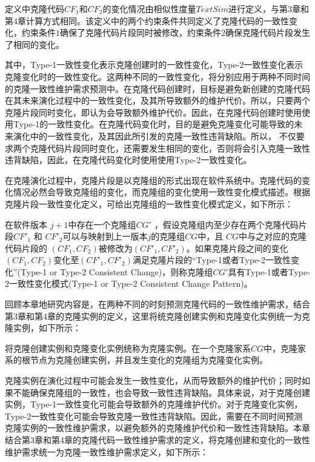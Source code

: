 定义中克隆代码$ CF_1 $和$ CF_2 $的变化情况由相似性度量$ \mathit {TextSim} $进行定义，与第3章和第4章计算方式相同。该定义中的两个约束条件共同定义了克隆代码的一致性变化，约束条件$1$确保了克隆代码片段同时被修改，约束条件$2$确保克隆代码片段发生了相同的变化。

其中，Type-1一致性变化表示克隆创建时的一致性变化，Type-2一致性变化表示克隆变化时的一致性变化。这两种不同的一致性变化，将分别应用于两种不同时间的克隆一致性维护需求预测中。在克隆代码创建时，目标是避免新创建的克隆代码在其未来演化过程中的一致性变化，及其所导致额外的维护代价。所以，只要两个克隆片段同时变化，即认为会导致额外维护代价。因此，在克隆代码创建时使用使用Type-1的一致性变化。在克隆代码变化时，目的是避免克隆变化可能导致的未来演化中的一致性变化，及其因此所引发的克隆一致性违背缺陷。所以， 不仅要求两个克隆代码片段同时变化，还需要发生相同的变化，否则将会引入克隆一致性违背缺陷，因此，在克隆代码变化时使用使用Type-2一致性变化。

在克隆演化过程中，克隆片段是以克隆组的形式出现在软件系统中。克隆代码的变化情况必然会导致克隆组的变化，而克隆组的变化使用一致性变化模式描述。根据克隆片段一致性变化定义，可给出克隆组的一致性变化模式定义，如下所示：

\begin{definition}[克隆一致性变化模式] 
\label{def-pattern}
在软件版本 $j+1$中存在一个克隆组$CG'$ ，假设克隆组内至少存在两个克隆代码片段$CF'_1$ 和 $CF'_2$可以与映射到上一版本$j$的克隆组$CG$中，且 $CG$中与之对应的克隆代码片段的 $(CF_1,CF_2)$被修改为$(CF'_1,CF'_2)$。如果克隆片段之间的变化 $(CF_1,CF_2)$变化至$(CF'_1,CF'_2)$满足克隆片段的“Type-1或者Type-2一致性变化”(Type-1 or Type-2 Consistent Change)，则称克隆组$CG'$具有Type-1或者Type-2一致性变化模式(Type-1 or  Type-2 Consistent Change Pattern)。
\end{definition}

回顾本章地研究内容是，在两种不同的时刻预测克隆代码的一致性维护需求，结合第3章和第4章的克隆实例的定义，这里将统克隆创建实例和克隆变化实例统一为克隆实例，如下所示：

\begin{definition}[克隆实例] 
\label{def-instance}
将克隆创建实例和克隆变化实例统称为克隆实例。在一个克隆家系$CG$中，克隆家系的根节点为克隆创建实例，并且发生变化的克隆组为克隆变化实例。
\end{definition}

克隆实例在演化过程中可能会发生一致性变化，从而导致额外的维护代价；同时如果不能确保克隆组的一致性，也会导致一致性违背缺陷。具体来说，对于克隆创建实例，Type-1一致性变化可能会导致额外的克隆维护代价。对于克隆变化实例，Type-2一致性变化可能会导致克隆一致性违背缺陷。因此，需要在不同时间预测克隆实例的一致性维护需求，以避免额外的克隆维护代价和一致性违背缺陷。本章结合第3章和第4章的克隆代码一致性维护需求的定义，将克隆创建和变化的一致性维护需求统一为克隆一致性维护需求定义，如下所示：

